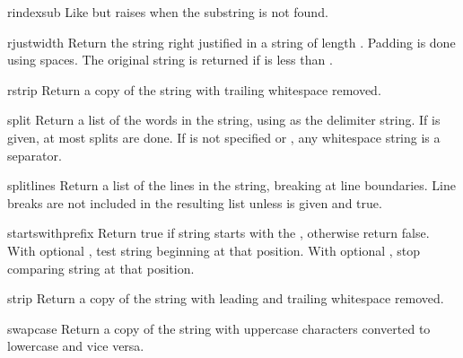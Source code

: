 \begin{methoddesc}[string]{rindex}{sub}
Like  but raises  when the
substring  is not found.
\end{methoddesc}

\begin{methoddesc}[string]{rjust}{width}
Return the string right justified in a string of length .
Padding is done using spaces.  The original string is returned if
 is less than .
\end{methoddesc}

\begin{methoddesc}[string]{rstrip}{}
Return a copy of the string with trailing whitespace removed.
\end{methoddesc}

\begin{methoddesc}[string]{split}{}
Return a list of the words in the string, using  as the
delimiter string.  If  is given, at most 
splits are done.  If  is not specified or , any
whitespace string is a separator.
\end{methoddesc}

\begin{methoddesc}[string]{splitlines}{}
Return a list of the lines in the string, breaking at line
boundaries.  Line breaks are not included in the resulting list unless
 is given and true.
\end{methoddesc}

\begin{methoddesc}[string]{startswith}{prefix}
Return true if string starts with the , otherwise
return false.  With optional , test string beginning at
that position.  With optional , stop comparing string at that
position.
\end{methoddesc}

\begin{methoddesc}[string]{strip}{}
Return a copy of the string with leading and trailing whitespace
removed.
\end{methoddesc}

\begin{methoddesc}[string]{swapcase}{}
Return a copy of the string with uppercase characters converted to
lowercase and vice versa.
\end{methoddesc}

